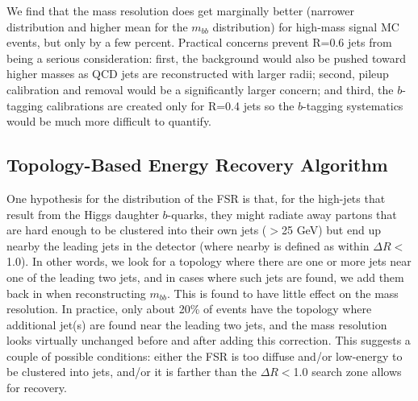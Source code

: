 We find that the mass resolution does get marginally better (narrower distribution and higher mean
for the $m_{bb}$ distribution) for high-mass signal MC events, but only by a few percent.
Practical concerns prevent R=0.6 jets from being a serious consideration: first, the background
would also be pushed toward higher masses as QCD jets are reconstructed with larger radii;
second, pileup calibration and removal would be a significantly larger concern; and third,
the $b$-tagging calibrations are created only for R=0.4 jets so the $b$-tagging systematics
would be much more difficult to quantify.  


\subsection{Topology-Based Energy Recovery Algorithm}
One hypothesis for the distribution of the FSR is that, for the high-\pt jets that result from the Higgs
daughter $b$-quarks, they might radiate away partons that are hard enough to be clustered into their own
jets (\pt$>$25 GeV) but end up nearby the leading jets in the detector (where nearby is defined as within
$\Delta R<$1.0). In other words, we look for a topology where there are one or more jets near one of the leading
two jets, and in cases where such jets are found, we add them back in when reconstructing $m_{bb}$.
This is found to have little effect on the mass resolution. In practice, only about 20\% of events
have the topology where additional jet(s) are found near the leading two jets, and the mass resolution
looks virtually unchanged before and after adding this correction. This suggests a couple of possible
conditions: either the FSR is too diffuse and/or low-energy to be clustered into jets, and/or it is farther
than the $\Delta R<$1.0 search zone allows for recovery. 
    
